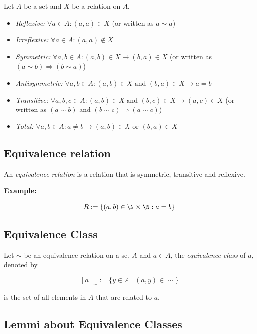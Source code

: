 Let \(A\) be a set and \(X\) be a relation on \(A\).

\begin{itemize}

	\item \emph{Reflexive:} \(\forall a \in A: (a, a) \in X\) (or written as \(a \sim a\))

	\item \emph{Irreflexive:} \(\forall a \in A: (a, a) \not\in X\)

	\item \emph{Symmetric:} \(\forall a, b \in A: (a, b) \in X \to (b, a) \in X\) (or written as 
		  \((a \sim b) \Rightarrow (b \sim a)\))

	\item \emph{Antisymmetric:} \(\forall a, b \in A: (a, b) \in X \text{ and } (b, a) \in X \to a = b\)

	\item \emph{Transitive:} \(\forall a, b, c \in A: (a, b) \in X \text{ and } (b, c) \in X \to (a, c) 
		  \in X\) (or written as \((a \sim b) \text{ and } (b \sim c) \Rightarrow (a \sim c)\))

	\item \emph{Total:} \(\forall a,b \in A: a \neq b \to (a, b) \in X \text{ or } (b, a) \in X\)

\end{itemize}

\subsection{Equivalence relation}

An \emph{equivalence relation} is a relation that is symmetric, transitive and reflexive.

\textbf{Example:}

\[
	R:= \{ (a,b) \in \N \times \N: a = b\}
\]

\subsection{Equivalence Class}

Let \(\sim\) be an equivalence relation on a set \(A\) and \(a \in A\), the 
\emph{equivalence class} of \(a\), denoted by 

\[
	[a]_{\sim} := \{y \in A \mid (a,y) \in \sim\}
\] 

is the set of all elements in \(A\) that are related to \(a\).

\subsection{Lemmi about Equivalence Classes}

